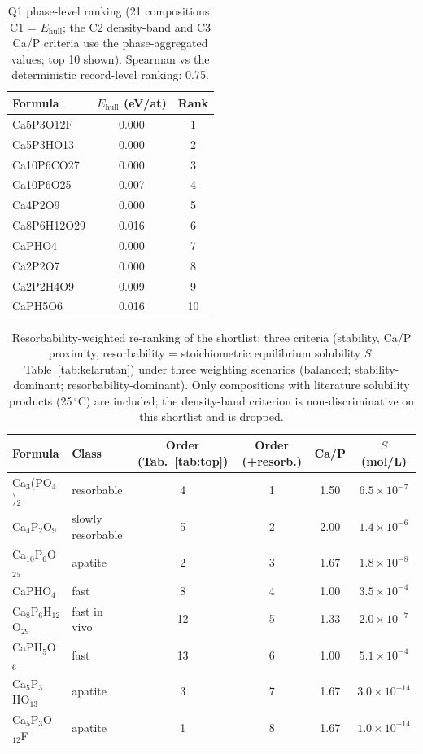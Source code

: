 \documentclass[11pt,a4paper]{article}
\begin{document}
\begin{table}[ht]
\centering\small
\caption{Q1 phase-level ranking (21 compositions; C1 = $E_\mathrm{hull}$; the C2 density-band and C3 Ca/P criteria use the phase-aggregated values; top 10 shown). Spearman vs the deterministic record-level ranking: 0.75.}
\label{tab:top_q1}
\begin{tabular}{lcc}
\toprule
Formula & $E_\mathrm{hull}$ (eV/at) & Rank \\
\midrule
Ca5P3O12F & 0.000 & 1 \\
Ca5P3HO13 & 0.000 & 2 \\
Ca10P6CO27 & 0.000 & 3 \\
Ca10P6O25 & 0.007 & 4 \\
Ca4P2O9 & 0.000 & 5 \\
Ca8P6H12O29 & 0.016 & 6 \\
CaPHO4 & 0.000 & 7 \\
Ca2P2O7 & 0.000 & 8 \\
Ca2P2H4O9 & 0.009 & 9 \\
CaPH5O6 & 0.016 & 10 \\
\bottomrule
\end{tabular}
\end{table}


\begin{table}[ht]
\centering\small
\caption{Resorbability-weighted re-ranking of the shortlist: three criteria (stability, Ca/P proximity, resorbability = stoichiometric equilibrium solubility $S$; Table~\ref{tab:kelarutan}) under three weighting scenarios (balanced; stability-dominant; resorbability-dominant). Only compositions with literature solubility products (25\,$^\circ$C) are included; the density-band criterion is non-discriminative on this shortlist and is dropped.}
\label{tab:resorb_rank}
\begin{tabular}{llcccc}
\toprule
Formula & Class & Order (Tab.~\ref{tab:top}) & Order (+resorb.) & Ca/P & $S$ (mol/L) \\
\midrule
Ca$_3$(PO$_4$)$_2$ & resorbable & 4 & 1 & 1.50 & $6.5\times10^{-7}$ \\
Ca$_4$P$_2$O$_9$ & slowly resorbable & 5 & 2 & 2.00 & $1.4\times10^{-6}$ \\
Ca$_{10}$P$_6$O$_{25}$ & apatite & 2 & 3 & 1.67 & $1.8\times10^{-8}$ \\
CaPHO$_4$ & fast & 8 & 4 & 1.00 & $3.5\times10^{-4}$ \\
Ca$_8$P$_6$H$_{12}$O$_{29}$ & fast in vivo & 12 & 5 & 1.33 & $2.0\times10^{-7}$ \\
CaPH$_5$O$_6$ & fast & 13 & 6 & 1.00 & $5.1\times10^{-4}$ \\
Ca$_5$P$_3$HO$_{13}$ & apatite & 3 & 7 & 1.67 & $3.0\times10^{-14}$ \\
Ca$_5$P$_3$O$_{12}$F & apatite & 1 & 8 & 1.67 & $1.0\times10^{-14}$ \\
\bottomrule
\end{tabular}
\end{table}
\end{document}
